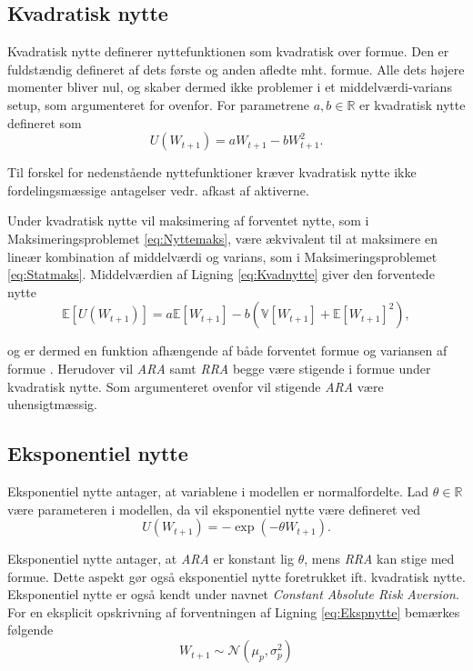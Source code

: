 \documentclass[
  a4paper,
  oneside]{memoir}
\begin{document}
\hypertarget{kvadratisk-nytte}{%
\subsection{Kvadratisk nytte}\label{kvadratisk-nytte}}

Kvadratisk nytte definerer nyttefunktionen som kvadratisk over formue. Den er fuldstændig defineret af dets første og anden afledte mht. formue. Alle dets højere momenter bliver nul, og skaber dermed ikke problemer i et middelværdi-varians setup, som argumenteret for ovenfor. For parametrene \(a,b\in\mathbb{R}\) er kvadratisk nytte defineret som
\begin{equation}
U(W_{t+1})=aW_{t+1}-bW_{t+1}^2. \label{eq:Kvadnytte}
\end{equation}

Til forskel for nedenstående nyttefunktioner kræver kvadratisk nytte ikke fordelingsmæssige antagelser vedr. afkast af aktiverne.

Under kvadratisk nytte vil maksimering af forventet nytte, som i Maksimeringsproblemet \eqref{eq:Nyttemaks}, være ækvivalent til at maksimere en lineær kombination af middelværdi og varians, som i Maksimeringsproblemet \eqref{eq:Statmaks}. Middelværdien af Ligning \eqref{eq:Kvadnytte} giver den forventede nytte
\[\mathbb{E}[U(W_{t+1})]=a\mathbb{E}[W_{t+1}]-b(\mathbb{V}[W_{t+1}]+\mathbb{E}[W_{t+1}]^2),\]

og er dermed en funktion afhængende af både forventet formue og variansen af formue \citep{Munk2017}. Herudover vil \emph{ARA} samt \emph{RRA} begge være stigende i formue under kvadratisk nytte. Som argumenteret ovenfor vil stigende \emph{ARA} være uhensigtmæssig.

\hypertarget{eksponentiel-nytte}{%
\subsection{Eksponentiel nytte}\label{eksponentiel-nytte}}

Eksponentiel nytte antager, at variablene i modellen er normalfordelte. Lad \(\theta\in\mathbb{R}\) være parameteren i modellen, da vil eksponentiel nytte være defineret ved
\begin{equation}
U(W_{t+1})=-\exp\left(-\theta W_{t+1}\right). \label{eq:Ekspnytte}
\end{equation}

Eksponentiel nytte antager, at \emph{ARA} er konstant lig \(\theta\), mens \emph{RRA} kan stige med formue. Dette aspekt gør også eksponentiel nytte foretrukket ift. kvadratisk nytte. Eksponentiel nytte er også kendt under navnet \emph{Constant Absolute Risk Aversion}. For en eksplicit opskrivning af forventningen af Ligning \eqref{eq:Ekspnytte} bemærkes følgende
\[W_{t+1}\sim \mathcal{N}\left(\mu_p,\sigma_p^2\right)\]
\end{document}
